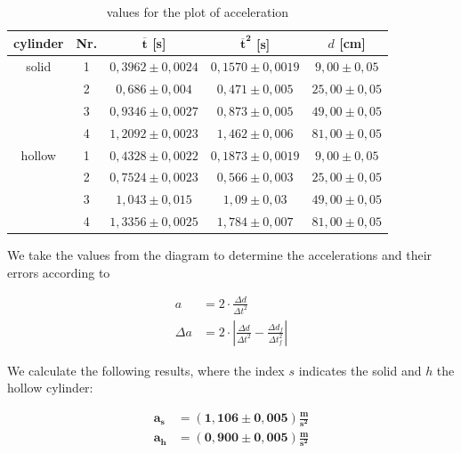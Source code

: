 \documentclass{article}
\begin{document}
\begin{table} [!ht]
    \centering
    \begin{tabular}{c|c|c|c|c}
        \hline
        \textbf{cylinder} & \textbf{Nr.} & $\bm{\overline{t}}$ [s] & $\bm{\overline{t}^2}$ [s] & $d$ [cm]\\ \hline
        solid & 1 & $0,3962 \pm 0,0024$ & $0,1570 \pm 0,0019$ & $9,00 \pm 0,05$ \\
         & 2 & $0,686 \pm 0,004$ & $0,471 \pm 0,005$ & $25,00 \pm 0,05$ \\
         & 3 & $0,9346 \pm 0,0027$ & $0,873 \pm 0,005$ & $49,00 \pm 0,05$ \\
         & 4 & $1,2092 \pm 0,0023$ & $1,462 \pm 0,006$ & $81,00 \pm 0,05$ \\ \hline
        hollow & 1 & $0,4328 \pm 0,0022$ & $0,1873 \pm 0,0019$ & $9,00 \pm 0,05$ \\
         & 2 & $0,7524 \pm 0,0023$ & $0,566 \pm 0,003$ & $25,00 \pm 0,05$ \\
         & 3 & $1,043 \pm 0,015$ & $1,09 \pm 0,03$ & $49,00 \pm 0,05$ \\
         & 4 & $1,3356 \pm 0,0025$ & $1,784 \pm 0,007$ & $81,00 \pm 0,05$ \\ \hline
    \end{tabular}
    \caption{values for the plot of acceleration}
    \label{tab:1}
\end{table}

\newpage

We take the values from the diagram to determine the accelerations and their errors according to

\begin{equation}
    \begin{split}
        a &= 2 \cdot \frac{\Delta d}{\Delta t^2} \\
        \Delta a &= 2 \cdot \left| \frac{\Delta d}{\Delta t^2} - \frac{\Delta d_f}{\Delta t_f^2} \right|
    \end{split}
    \label{eq:97}
\end{equation}

We calculate the following results, where the index $s$ indicates the solid and $h$ the hollow cylinder:

\begin{equation}
    \begin{split}
        \bm{a_s} &= \bm{(1,106 \pm 0,005) \frac{\textbf{m}}{\textbf{s}^2}} \\
        \bm{a_h} &= \bm{(0,900 \pm 0,005) \frac{\textbf{m}}{\textbf{s}^2}} \\
    \end{split}
    \label{res:a}
\end{equation}
\end{document}
